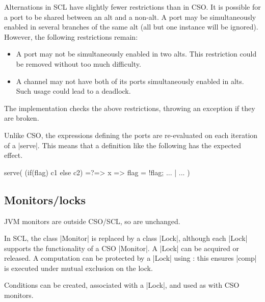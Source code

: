 \documentclass[11pt,a4paper]{article}
\begin{document}
Alternations in SCL have slightly fewer restrictions than in CSO\@.  It is
possible for a port to be shared between an alt and a non-alt.  A port may be
simultaneously enabled in several branches of the same alt (all but one
instance will be ignored). However, the following restrictions remain:
%
\begin{itemize}
\item A port may not be simultaneously enabled in two alts.  This restriction
  could be removed without too much difficulty.

\item A channel may not have both of its ports simultaneously enabled in
  alts.  Such usage could lead to a deadlock.
\end{itemize}
%
The implementation checks the above restrictions, throwing an exception if
they are broken. 

Unlike CSO, the expressions defining the ports are re-evaluated on each
iteration of a |serve|.  This means that a definition like the following has
the expected effect.
\begin{scala}
  serve( (if(flag) c1 else c2) =?=> { x => flag = !flag; ... } | ... )
\end{scala}



\subsection*{Monitors/locks}

JVM monitors are outside CSO/SCL, so are unchanged.

In SCL, the class |Monitor| is replaced by a class |Lock|, although each
|Lock| supports the functionality of a CSO |Monitor|.  A |Lock| can be
acquired or released.  A computation can be protected by a |Lock| using
: this ensures |comp| is executed under mutual
exclusion on the lock.  

Conditions can be created, associated with a |Lock|, and used as with CSO
monitors.
\end{document}
